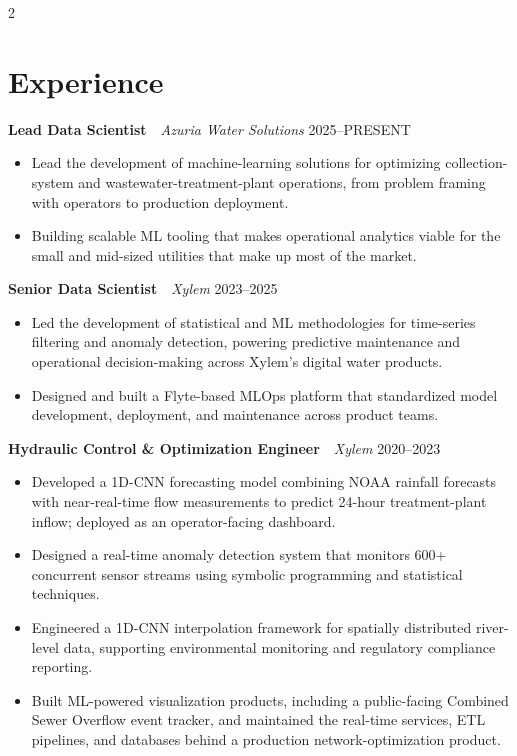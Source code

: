 \documentclass{article}
\newcommand{\role}[4]{
  {\large\textbf{#1}}~~{\color{slate}\itshape #2} \hfill {\metafont\footnotesize\textcolor{slate}{#3}}\\[0.2em]
  #4
}
\begin{document}
\begin{paracol}{2}

\section{Experience}
\role{Lead Data Scientist}{Azuria Water Solutions}{2025–PRESENT}{
\begin{itemize}[leftmargin=*, itemsep=0.8mm, topsep=0.5mm]
  \item Lead the development of machine-learning solutions for optimizing collection-system and wastewater-treatment-plant operations, from problem framing with operators to production deployment.
  \item Building scalable ML tooling that makes operational analytics viable for the small and mid-sized utilities that make up most of the market.
\end{itemize}
}
\vspace{0.6em}

\role{Senior Data Scientist}{Xylem}{2023–2025}{
\begin{itemize}[leftmargin=*, itemsep=0.8mm, topsep=0.5mm]
  \item Led the development of statistical and ML methodologies for time-series filtering and anomaly detection, powering predictive maintenance and operational decision-making across Xylem's digital water products.
  \item Designed and built a Flyte-based MLOps platform that standardized model development, deployment, and maintenance across product teams.
\end{itemize}
}
\vspace{0.6em}

\role{Hydraulic Control \& Optimization Engineer}{Xylem}{2020–2023}{
\begin{itemize}[leftmargin=*, itemsep=0.8mm, topsep=0.5mm]
  \item Developed a 1D-CNN forecasting model combining NOAA rainfall forecasts with near-real-time flow measurements to predict 24-hour treatment-plant inflow; deployed as an operator-facing dashboard.
  \item Designed a real-time anomaly detection system that monitors 600+ concurrent sensor streams using symbolic programming and statistical techniques.
  \item Engineered a 1D-CNN interpolation framework for spatially distributed river-level data, supporting environmental monitoring and regulatory compliance reporting.
  \item Built ML-powered visualization products, including a public-facing Combined Sewer Overflow event tracker, and maintained the real-time services, ETL pipelines, and databases behind a production network-optimization product.
\end{itemize}
}


\end{paracol}
\end{document}
